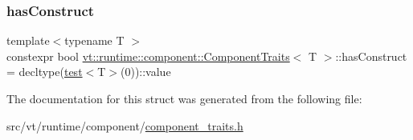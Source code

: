 \subsubsection{\texorpdfstring{has\+Construct}{hasConstruct}}
{\footnotesize\ttfamily template$<$typename T $>$ \\
constexpr bool \hyperlink{structvt_1_1runtime_1_1component_1_1_component_traits}{vt\+::runtime\+::component\+::\+Component\+Traits}$<$ T $>$\+::has\+Construct = decltype(\hyperlink{structvt_1_1runtime_1_1component_1_1_component_traits_a9c457498be041dcab634bf1665e63a25}{test}$<$T$>$(0))\+::value\hspace{0.3cm}{\ttfamily [static]}}



The documentation for this struct was generated from the following file\+:\begin{DoxyCompactItemize}
\item 
src/vt/runtime/component/\hyperlink{component__traits_8h}{component\+\_\+traits.\+h}\end{DoxyCompactItemize}
